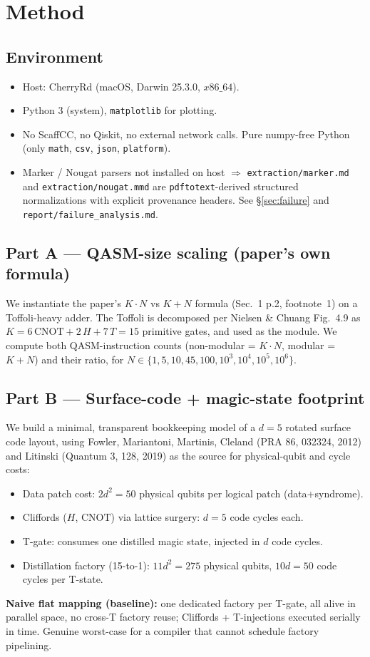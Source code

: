 \documentclass[11pt]{article}
\begin{document}
\section{Method}

\subsection{Environment}
\begin{itemize}
  \item Host: CherryRd (macOS, Darwin 25.3.0, $x86\_64$).
  \item Python 3 (system), \texttt{matplotlib} for plotting.
  \item No ScaffCC, no Qiskit, no external network calls.  Pure numpy-free
    Python (only \texttt{math}, \texttt{csv}, \texttt{json}, \texttt{platform}).
  \item Marker / Nougat parsers not installed on host $\Rightarrow$
    \texttt{extraction/marker.md} and \texttt{extraction/nougat.mmd} are
    \texttt{pdftotext}-derived structured normalizations with explicit
    provenance headers.  See \S\ref{sec:failure} and
    \texttt{report/failure\_analysis.md}.
\end{itemize}

\subsection{Part A --- QASM-size scaling (paper's own formula)}
We instantiate the paper's $K\cdot N$ vs $K+N$ formula
(Sec.~1 p.2, footnote~1) on a Toffoli-heavy adder.  The Toffoli is decomposed
per Nielsen \& Chuang Fig.~4.9 as $K = 6\,\mathrm{CNOT} + 2\,H + 7\,T = 15$
primitive gates, and used as the module.  We compute both QASM-instruction
counts (non-modular = $K\cdot N$, modular = $K + N$) and their ratio, for
$N \in \{1, 5, 10, 45, 100, 10^3, 10^4, 10^5, 10^6\}$.

\subsection{Part B --- Surface-code + magic-state footprint}
We build a minimal, transparent bookkeeping model of a $d=5$ rotated surface
code layout, using Fowler, Mariantoni, Martinis, Cleland (PRA 86, 032324,
2012) and Litinski (Quantum 3, 128, 2019) as the source for physical-qubit and
cycle costs:
\begin{itemize}
  \item Data patch cost: $2 d^2 = 50$ physical qubits per logical patch (data+syndrome).
  \item Cliffords ($H$, $\mathrm{CNOT}$) via lattice surgery: $d = 5$ code cycles each.
  \item T-gate: consumes one distilled magic state, injected in $d$ code cycles.
  \item Distillation factory (15-to-1): $11 d^2 = 275$ physical qubits, $10 d = 50$ code cycles per T-state.
\end{itemize}
\textbf{Naive flat mapping (baseline):} one dedicated factory per T-gate, all
alive in parallel space, no cross-T factory reuse; Cliffords + T-injections
executed serially in time.  Genuine worst-case for a compiler that cannot
schedule factory pipelining.
\end{document}
